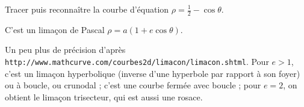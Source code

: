 \begin{enonce}
\begin{exercise}[ID={RMS 120/860 Centrale PSI},subtitle={},tags={}]
Tracer puis reconnaître la courbe d'équation $\rho=\frac12-\cos\theta$.
\end{exercise}
\begin{solution}
C'est un limaçon de Pascal $\rho=a(1+e\cos\theta)$.

Un peu plus de précision d'après \texttt{http://www.mathcurve.com/courbes2d/limacon/limacon.shtml}.
Pour $e>1$, c'est un limaçon hyperbolique (inverse d’une hyperbole par rapport à son foyer) ou à boucle, ou crunodal ; c'est une courbe fermée avec boucle ; pour $e = 2$, on obtient le limaçon trisecteur, qui est aussi une rosace.
\end{solution}
\end{enonce}
